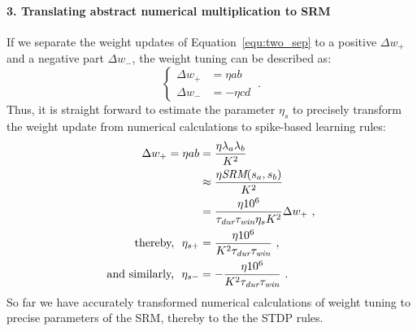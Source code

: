 

\paragraph{3. Translating abstract numerical multiplication to SRM\\}
If we separate the weight updates of Equation~\ref{equ:two_sep} to a positive $\Delta w_+$ and a negative part $\Delta w_-$, the weight tuning can be described as:
\begin{equation}
\left\{
\begin{aligned} 
\Delta w_+ &= \eta ab\\
\Delta w_- &= -\eta cd
\end{aligned}
\right.~.
\end{equation}
Thus, it is straight forward to estimate the parameter $\eta_s$ to precisely transform the weight update from numerical calculations to spike-based learning rules:
\begin{equation}
\begin{aligned} 
\Delta w_+ = \eta ab &=\frac{\eta \lambda_a \lambda_b}{K^2}\\
&\approx \frac{\eta \textit{\textrm{SRM}}(s_a, s_b)}{K^2}\\ &=
\frac{\eta 10^6}{\tau_{\textit{\textrm{dur}}}
\tau_{\textit{\textrm{win}}}
\eta_s K^2}
\Delta w_+~,\\
\textrm{thereby,~~}
\eta_{s+} &=  \frac{\eta 10^6}{K^2 \tau_{\textit{\textrm{dur}}} \tau_{\textit{\textrm{win}}}}~,\\
\textrm{and similarly,~~}
\eta_{s-} &=  -\frac{\eta 10^6}{K^2 \tau_{\textit{\textrm{dur}}} \tau_{\textit{\textrm{win}}}}~.
\end{aligned}
\label{equ:srm}
\end{equation}
So far we have accurately transformed numerical calculations of weight tuning to precise parameters of the SRM, thereby to the \DIFdelbegin {}\DIFdelend \DIFaddbegin {}\DIFaddend the STDP rules.


